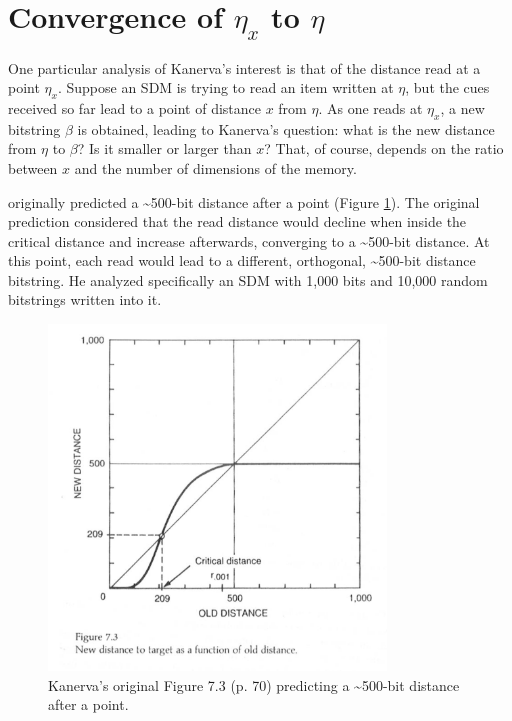 \section{Convergence of $\eta_x$ to $\eta$}

One particular analysis of Kanerva's interest is that of the distance read at a point $\eta_x$. Suppose an SDM is trying to read an item written at $\eta$, but the cues received so far lead to a point of distance $x$ from $\eta$.  As one reads at $\eta_x$, a new bitstring $\beta$ is obtained, leading to Kanerva's question: what is the new distance from $\eta$ to $\beta$? Is it smaller or larger than $x$? That, of course, depends on the ratio between $x$ and the number of dimensions of the memory.

\citet[p.70]{Kanerva1988} originally predicted a \textasciitilde 500-bit distance after a point (Figure \ref{fig:kanerva-figure-7.3}). The original prediction considered that the read distance would decline when inside the critical distance and increase afterwards, converging to a \textasciitilde 500-bit distance.  At this point, each read would lead to a different, orthogonal, \textasciitilde 500-bit distance bitstring. He analyzed specifically an SDM with 1,000 bits and 10,000 random bitstrings written into it.

\begin{figure}[h]
\centering\includegraphics[width=0.8\textwidth]{images02/kanerva-table-7-2-original.png}
\caption{Kanerva's original Figure 7.3 (p. 70) predicting a \textasciitilde 500-bit distance after a point.
\label{fig:kanerva-figure-7.3}}
\end{figure}

